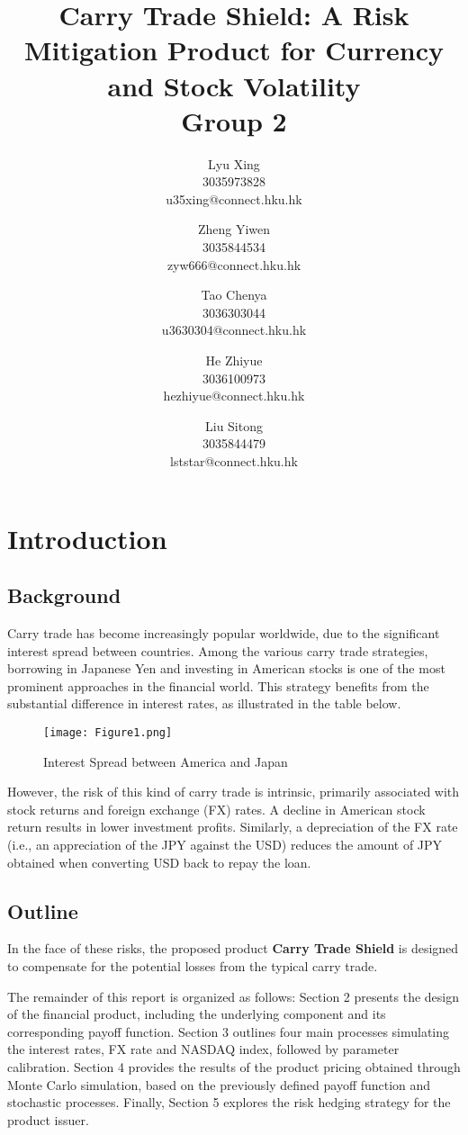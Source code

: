 \documentclass[a4paper, twocolumn]{article}
\date{}
\title{
\textbf{Carry Trade Shield: A Risk Mitigation Product for Currency and Stock Volatility}\\
Group 2
}
\author{
    Lyu Xing \\
    3035973828 \\
    u35xing@connect.hku.hk
    \and
    Zheng Yiwen \\
    3035844534 \\
    zyw666@connect.hku.hk
    \and
    Tao Chenya \\
    3036303044 \\
    u3630304@connect.hku.hk
    \and
    He Zhiyue \\
    3036100973 \\
    hezhiyue@connect.hku.hk
    \and
    Liu Sitong \\
    3035844479 \\
    lststar@connect.hku.hk
}
\begin{document}
\maketitle

\section{Introduction}

\subsection{Background}

Carry trade has become increasingly popular worldwide, due to the significant interest spread between countries. Among the various carry trade strategies, borrowing in Japanese Yen and investing in American stocks is one of the most prominent approaches in the financial world. This strategy benefits from the substantial difference in interest rates, as illustrated in the table below. 

\begin{figure}[ht]
    \begin{center}
    \texttt{[image: Figure1.png]}
    \caption{Interest Spread between America and Japan}
    \label{fig:picture1}
    \end{center}
\end{figure}

However, the risk of this kind of carry trade is intrinsic, primarily associated with stock returns and foreign exchange (FX) rates. A decline in American stock return results in lower investment profits. Similarly, a depreciation of the FX rate (i.e., an appreciation of the JPY against the USD) reduces the amount of JPY obtained when converting USD back to repay the loan.  

\subsection{Outline}

In the face of these risks, the proposed product \textbf{Carry Trade Shield} is designed to compensate for the potential losses from the typical carry trade. 

The remainder of this report is organized as follows: Section 2 presents the design of the financial product, including the underlying component and its corresponding payoff function. Section 3 outlines four main processes simulating the interest rates, FX rate and NASDAQ index, followed by parameter calibration. Section 4 provides the results of the product pricing obtained through Monte Carlo simulation, based on the previously defined payoff function and stochastic processes. Finally, Section 5 explores the risk hedging strategy for the product issuer. 
\end{document}
